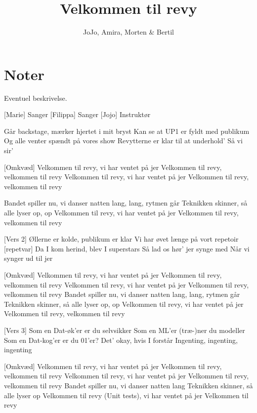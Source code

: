 \documentclass{article}
\title{Velkommen til revy}                   %
\author{JoJo, Amira, Morten \& Bertil}  %
\begin{document}
                
\maketitle
\section*{Noter}                %
Eventuel beskrivelse.

\begin{roles}
[Marie] Sanger
[Filippa] Sanger
[Jojo] Instruktør
\end{roles}

\begin{props}
\end{props}


\newpage%
\begin{song}
[Vers 1]
Går backstage, mærker hjertet i mit bryst
Kan se at UP1 er fyldt med publikum
Og alle venter spændt på vores show
Revytterne er klar til at underhold’
Så vi sir’


[Omkvæd]
Velkommen til revy, vi har ventet på jer
Velkommen til revy, velkommen til revy
Velkommen til revy, vi har ventet på jer
Velkommen til revy, velkommen til revy

Bandet spiller nu, vi danser natten lang,
lang, rytmen går 
Teknikken skinner, så alle lyser op,
op
Velkommen til revy, vi har ventet på jer
Velkommen til revy, velkommen til revy



[Vers 2]
Øllerne er kolde, publikum er klar
Vi har øvet længe på vort repetoir [repetvar]
Da I kom herind, blev I superstars
Så lad os hør’ jer synge med
Når vi synger ud til jer



[Omkvæd]
Velkommen til revy, vi har ventet på jer
Velkommen til revy, velkommen til revy
Velkommen til revy, vi har ventet på jer
Velkommen til revy, velkommen til revy
Bandet spiller nu, vi danser natten lang,
lang, rytmen går 
Teknikken skinner, så alle lyser op,
op
Velkommen til revy, vi har ventet på jer
Velkommen til revy, velkommen til revy




[Vers 3]
Som en Dat-øk’er er du selvsikker
Som en ML’er (træ-)ner du modeller
Som en Dat-kog’er er du 01’er?
Det’ okay, hvis I forstår
Ingenting, ingenting, ingenting





[Omkvæd]
Velkommen til revy, vi har ventet på jer
Velkommen til revy, velkommen til revy
Velkommen til revy, vi har ventet på jer
Velkommen til revy, velkommen til revy
Bandet spiller nu, vi danser natten lang
Teknikken skinner, så alle lyser op
Velkommen til revy (Unit tests), vi har ventet på jer
Velkommen til revy 


\end{song}
\end{document}
